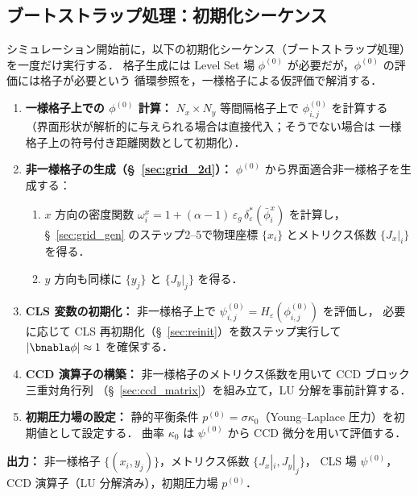 
\subsection{ブートストラップ処理：初期化シーケンス}
\label{sec:bootstrap}

シミュレーション開始前に，以下の初期化シーケンス（ブートストラップ処理）を一度だけ実行する．
格子生成には Level Set 場 $\phi^{(0)}$ が必要だが，$\phi^{(0)}$ の評価には格子が必要という
循環参照を，一様格子による仮評価で解消する．

\begin{tcolorbox}[algbox, title={ブートストラップ処理：初期化シーケンス}]
\begin{enumerate}
  \item \textbf{一様格子上での $\phi^{(0)}$ 計算：}
        $N_x \times N_y$ 等間隔格子上で $\phi^{(0)}_{i,j}$ を計算する
        （界面形状が解析的に与えられる場合は直接代入；そうでない場合は
        一様格子上の符号付き距離関数として初期化）．
  \item \textbf{非一様格子の生成（§~\ref{sec:grid_2d}）：}
        $\phi^{(0)}$ から界面適合非一様格子を生成する：
        \begin{enumerate}
          \item $x$ 方向の密度関数 $\omega^x_i = 1 + (\alpha-1)\,\varepsilon_g\,\delta_\varepsilon^*(\bar{\phi}^x_i)$ を計算し，
                §~\ref{sec:grid_gen} のステップ2--5で物理座標 $\{x_i\}$ とメトリクス係数 $\{J_x|_i\}$ を得る．
          \item $y$ 方向も同様に $\{y_j\}$ と $\{J_y|_j\}$ を得る．
        \end{enumerate}
  \item \textbf{CLS 変数の初期化：}
        非一様格子上で $\psi^{(0)}_{i,j} = H_\varepsilon(\phi^{(0)}_{i,j})$ を評価し，
        必要に応じて CLS 再初期化（§~\ref{sec:reinit}）を数ステップ実行して
        $|\bnabla\phi| \approx 1$ を確保する．
  \item \textbf{CCD 演算子の構築：}
        非一様格子のメトリクス係数を用いて CCD ブロック三重対角行列
        （§~\ref{sec:ccd_matrix}）を組み立て，LU 分解を事前計算する．
  \item \textbf{初期圧力場の設定：}
        静的平衡条件 $p^{(0)} = \sigma\kappa_0$（Young--Laplace 圧力）を初期値として設定する．
        曲率 $\kappa_0$ は $\psi^{(0)}$ から CCD 微分を用いて評価する．
\end{enumerate}

\textbf{出力：}
非一様格子 $\{(x_i, y_j)\}$，メトリクス係数 $\{J_x|_i, J_y|_j\}$，
CLS 場 $\psi^{(0)}$，CCD 演算子（LU 分解済み），初期圧力場 $p^{(0)}$．
\end{tcolorbox}


